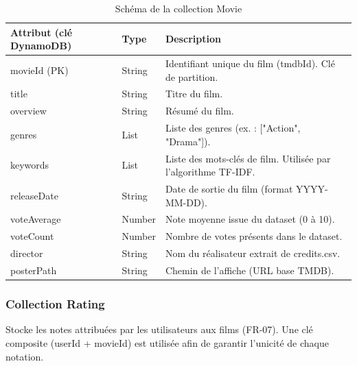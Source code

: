 \documentclass[a4paper,12pt]{report}
\begin{document}
\begin{table}[htbp]
\centering
\begin{tabular}{llp{8cm}}
\toprule
\textbf{Attribut (clé DynamoDB)} & \textbf{Type} & \textbf{Description} \\
\midrule
movieId (PK) & String & Identifiant unique du film (tmdbId). Clé de partition. \\

title & String & Titre du film. \\

overview & String & Résumé du film. \\

genres & List & Liste des genres (ex. : ["Action", "Drama"]). \\

keywords & List & Liste des mots-clés de film. Utilisée par l'algorithme TF-IDF. \\

releaseDate & String & Date de sortie du film (format YYYY-MM-DD). \\

voteAverage & Number & Note moyenne issue du dataset (0 à 10). \\

voteCount & Number & Nombre de votes présents dans le dataset. \\

director & String & Nom du réalisateur extrait de credits.csv. \\

posterPath & String & Chemin de l'affiche (URL base TMDB). \\

\bottomrule
\end{tabular}
\caption{Schéma de la collection Movie}
\end{table}

\newpage

\subsubsection{Collection Rating}

Stocke les notes attribuées par les utilisateurs aux films (FR-07). Une clé composite (userId + movieId) est utilisée afin de garantir l'unicité de chaque notation.
\end{document}
